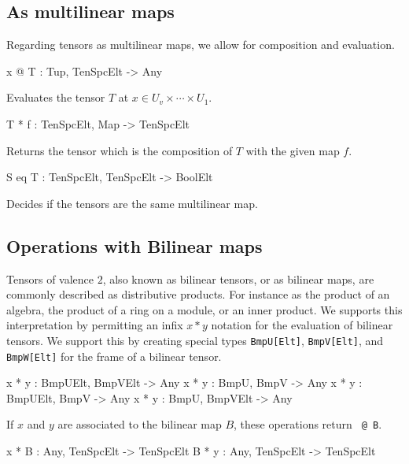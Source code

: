 \subsection{As multilinear maps}
Regarding tensors as multilinear maps, we allow for composition and evaluation.

\begin{intrinsics}
x @ T : Tup, TenSpcElt -> Any
\end{intrinsics}

Evaluates the tensor $T$ at $x\in U_v\times \cdots \times U_1$.

\begin{intrinsics}
T * f : TenSpcElt, Map -> TenSpcElt
\end{intrinsics}

Returns the tensor which is the composition of $T$ with the given map $f$.

\begin{intrinsics}
S eq T : TenSpcElt, TenSpcElt -> BoolElt
\end{intrinsics}

Decides if the tensors are the same multilinear map.

\subsection{Operations with Bilinear maps}
Tensors of valence $2$, also known as bilinear tensors, or
as bilinear maps,  are commonly described as distributive products.
For instance as the product of an algebra, the product of a ring on 
a module, or an inner product.  We supports this interpretation 
by permitting an infix $x*y$ notation for the evaluation of bilinear
tensors.  We support this by creating special types 
{\tt BmpU[Elt]}, {\tt BmpV[Elt]}, and {\tt BmpW[Elt]} for the frame
of a bilinear tensor.


\begin{intrinsics}
x * y : BmpUElt, BmpVElt -> Any
x * y : BmpU, BmpV -> Any
x * y : BmpUElt, BmpV -> Any
x * y : BmpU, BmpVElt -> Any
\end{intrinsics}

If $x$ and $y$ are associated to the bilinear map $B$, these operations return 
{\tt <x,y> @ B}.

\begin{intrinsics}
x * B : Any, TenSpcElt -> TenSpcElt
B * y : Any, TenSpcElt -> TenSpcElt
\end{intrinsics}


